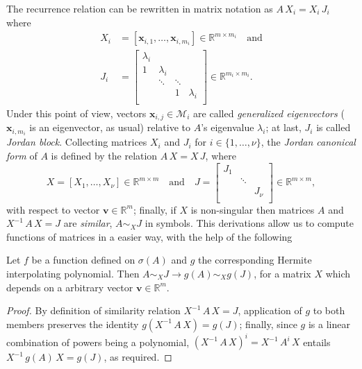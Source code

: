 The recurrence relation can be rewritten in matrix notation as $A\,X_{i} = X_{i}\,J_{i}$ where
\begin{displaymath}
\begin{split}
X_{i}   &= \left[\boldsymbol{x}_{i,1},\ldots,\boldsymbol{x}_{i,m_{i}} \right]\in\mathbb{R}^{m\times m_{i}}\quad\text{and} \\
J_{i}   &= \left[ \begin{array}{cccc}
    \lambda_{i} \\
    1 & \lambda_{i} \\
      & \ddots & \ddots \\
      & & 1 &\lambda_{i} \\
\end{array} \right] \in\mathbb{R}^{m_{i}\times m_{i}}.
\end{split}
\end{displaymath}
Under this point of view, vectors $\boldsymbol{x}_{i,j}\in\mathcal{M}_{i}$ are
called \textit{generalized eigenvectors} ($\boldsymbol{x}_{i,m_{i}}$ is an
eigenvector, as usual) relative to $A$'s eigenvalue $\lambda_{i}$; at last,
$J_{i}$ is called \textit{Jordan block}.  Collecting matrices $X_{i}$ and
$J_{i}$ for $i\in \lbrace 1,\ldots,\nu \rbrace$, the \textit{Jordan canonical
form} of $A$ is defined by the relation $A\,X = X\, J$, where
\begin{displaymath}
X = \left[X_{1},\ldots,X_{\nu} \right]\in\mathbb{R}^{m\times m} \quad\text{and}\quad
J = \left[ \begin{array}{ccc}
    J_{1} \\
      & \ddots \\
      & & J_{\nu} \\
\end{array} \right] \in\mathbb{R}^{m\times m},
\end{displaymath}
with respect to vector $\boldsymbol{v}\in\mathbb{R}^{m}$; finally, if $X$ is
non-singular then matrices $A$ and $X^{-1}\,A\,X = J$ are \textit{similar}, $A
\sim_{X} J$ in symbols. This derivations allow us to compute functions of
matrices in a easier way, with the help of the following 
\begin{lemma} Let $f$ be a function defined on $\sigma(A)$ and $g$ the 
corresponding Hermite interpolating polynomial. Then $ A \sim_{X} J \rightarrow
g(A) \sim_{X} g(J) $, for a matrix $X$ which depends on a arbitrary vector
$\boldsymbol{v}\in\mathbb{R}^{m}$.
\end{lemma}
\begin{proof}
By definition of similarity relation $ X^{-1}\,A\,X = J$, application of $g$ to
both members preserves the identity $ g(X^{-1}\,A\,X) = g(J)$; finally, since
$g$ is a linear combination of powers being a polynomial,
$\left(X^{-1}\,A\,X\right)^{i} = X^{-1}\,A^{i}\,X$ entails $X^{-1}\,g(A)\,X =
g(J)$, as required.
\end{proof}
